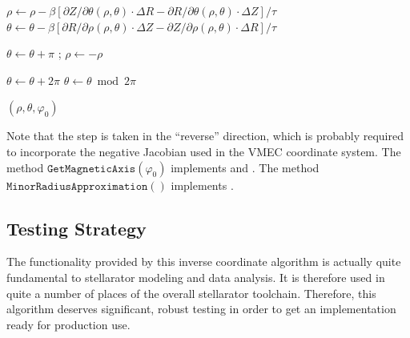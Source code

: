\begin{algorithm}
\begin{algorithmic}[1]
      \State $\rho   \gets \rho   - \beta \left[\partial Z / \partial \theta (\rho, \theta) \cdot \Delta R - \partial R / \partial \theta (\rho, \theta) \cdot \Delta Z \right] / \tau$
      \State $\theta \gets \theta - \beta \left[\partial R / \partial \rho   (\rho, \theta) \cdot \Delta Z - \partial Z / \partial \rho   (\rho, \theta) \cdot \Delta R \right] / \tau$

        \State $\theta \gets \theta + \pi$ ; $\rho \gets -\rho$
      \EndIf

        \State $\theta \gets \theta + 2 \pi$
      \EndWhile
      \State $\theta \gets \theta \bmod 2 \pi$

    \EndFor

    \State \Return $(\rho, \theta, \varphi_0)$
  \end{algorithmic}
  \label{alg:inverse_coordinate_transform}
\end{algorithm}
%
Note that the step is taken in the ``reverse'' direction,
which is probably required to incorporate the negative Jacobian used in the VMEC coordinate system.
%
The method $\texttt{GetMagneticAxis}(\varphi_0)$ implements  and .
%
The method $\texttt{MinorRadiusApproximation}()$ implements .

\FloatBarrier
\subsection{Testing Strategy}
%
The functionality provided by this inverse coordinate algorithm is actually quite fundamental
to stellarator modeling and data analysis.
%
It is therefore used in quite a number of places of the overall stellarator toolchain.
%
Therefore, this algorithm deserves significant, robust testing
in order to get an implementation ready for production use.

